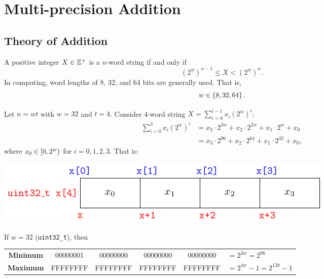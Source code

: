 \chapter{Multi-precision Addition}

\section{Theory of Addition}
\begin{remark}
A positive integer $X\in\mathbb{Z}^+$ is a $n$-word string if and only if \[
(2^w)^{n-1}\leq X<(2^w)^n.
\] In computing, word lengths of 8, 32, and 64 bits are generally used. That is, \[
w\in\set{8,32,64}.
\]
\end{remark}
\vfill
\begin{example}
	Let $n=wt$ with $w=32$ and $t=4$. Consider 4-word string $X=\sum_{i=0}^{t-1}x_i(2^w)^i$: \begin{align*}
	\sum_{i=0}^{3}x_i(2^w)^i&=x_3\cdot 2^{3w}+x_2\cdot 2^{2w}+x_1\cdot 2^{w}+x_0\\
	&=x_3\cdot 2^{96}+x_2\cdot 2^{64}+x_1\cdot 2^{32}+x_0,
	\end{align*} where $x_0\in\intco{0,2^w}$ for $i=0,1,2,3$. That is:
	\begin{center}
		\includegraphics[]{tikz/example1-1.pdf}
	\end{center}
	If $w=32$ (\texttt{uint32\_t}), then \begin{table}[h!]\centering\renewcommand{\arraystretch}{1.25}
		{\ttfamily\begin{tabular}{c|c|c|c|c|l}
				\cline{2-5}
				\textnormal{\bf Minimum} & 00000001 & 00000000 & 00000000 & 00000000 & $=2^{3w}=2^{96}$\\ \cline{2-5}
				\textnormal{\bf Maximum} & FFFFFFFF & FFFFFFFF & FFFFFFFF & FFFFFFFF & $=2^{4w}-1=2^{128}-1$\\ \cline{2-5}
		\end{tabular}}
	\end{table}
\end{example}

